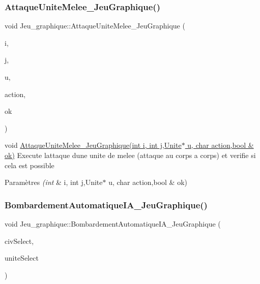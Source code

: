 \subsubsection{\texorpdfstring{Attaque\+Unite\+Melee\+\_\+\+Jeu\+Graphique()}{AttaqueUniteMelee\_JeuGraphique()}}
{\footnotesize\ttfamily void Jeu\+\_\+graphique\+::\+Attaque\+Unite\+Melee\+\_\+\+Jeu\+Graphique (\begin{DoxyParamCaption}\item[{int}]{i,  }\item[{int}]{j,  }\item[{\hyperlink{classUnite}{Unite} $\ast$}]{u,  }\item[{char}]{action,  }\item[{bool \&}]{ok }\end{DoxyParamCaption})}



void \hyperlink{classJeu__graphique_aae9e116a4e3651b22ba244957d98e076}{Attaque\+Unite\+Melee\+\_\+\+Jeu\+Graphique(int i, int j,\+Unite$\ast$ u, char action,bool \& ok)} Execute l\textquotesingle{}attaque d\textquotesingle{}une unite de melee (attaque au corps a corps) et verifie si cela est possible 


\begin{DoxyParams}{Paramètres}
{\em (int} & i, int j,Unite$\ast$ u, char action,bool \& ok) \\
\hline
\end{DoxyParams}
\mbox{\label{classJeu__graphique_ada61d087659270184bc8a1ceac9c78f6}} 
\subsubsection{\texorpdfstring{Bombardement\+Automatique\+I\+A\+\_\+\+Jeu\+Graphique()}{BombardementAutomatiqueIA\_JeuGraphique()}}
{\footnotesize\ttfamily void Jeu\+\_\+graphique\+::\+Bombardement\+Automatique\+I\+A\+\_\+\+Jeu\+Graphique (\begin{DoxyParamCaption}\item[{int}]{civ\+Select,  }\item[{int}]{unite\+Select }\end{DoxyParamCaption})}



